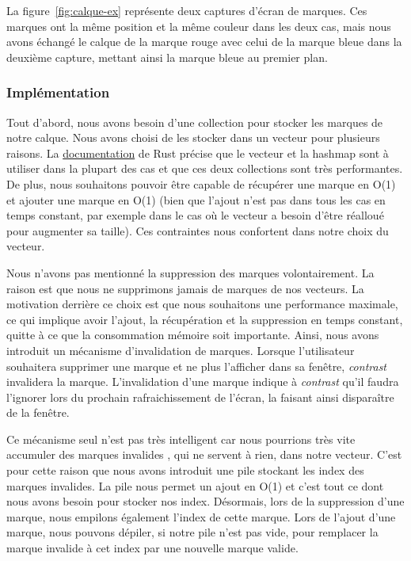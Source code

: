 \documentclass[12pt]{article}
\begin{document}
La figure~\ref{fig:calque-ex} représente deux captures d'écran de marques.
Ces marques ont la même position et la même couleur dans les deux cas, mais nous avons échangé le calque
de la marque rouge avec celui de la marque bleue dans la deuxième capture, mettant ainsi la marque bleue
au premier plan.

\subsubsection{Implémentation}

Tout d'abord, nous avons besoin d'une collection pour stocker les marques de notre calque.
Nous avons choisi de les stocker dans un vecteur pour plusieurs raisons.
La \href{https://doc.rust-lang.org/std/collections/index.html}{documentation} de Rust précise que le
vecteur et la hashmap sont à utiliser dans la plupart des cas et que ces deux collections sont très
performantes.
De plus, nous souhaitons pouvoir être capable de récupérer une marque en O(1) et ajouter une marque en
O(1) (bien que l'ajout n'est pas dans tous les cas en temps constant, par exemple dans le cas où le
vecteur a besoin d'être réalloué pour augmenter sa taille). Ces contraintes nous confortent dans notre
choix du vecteur.

Nous n'avons pas mentionné la suppression des marques volontairement. La raison est que nous ne supprimons
jamais de marques de nos vecteurs. La motivation derrière ce choix est que nous souhaitons une performance
maximale, ce qui implique avoir l'ajout, la récupération et la suppression en temps constant, quitte à
ce que la consommation mémoire soit importante.
Ainsi, nous avons introduit un mécanisme d'invalidation de marques. Lorsque l'utilisateur souhaitera
supprimer une marque et ne plus l'afficher dans sa fenêtre, \textit{contrast} invalidera la marque.
L'invalidation d'une marque indique à \textit{contrast} qu'il faudra l'ignorer lors du prochain
rafraichissement de l'écran, la faisant ainsi disparaître de la fenêtre.

Ce mécanisme seul n'est pas très intelligent car nous pourrions très vite accumuler des marques invalides
, qui ne servent à rien, dans notre vecteur.
C'est pour cette raison que nous avons introduit une pile stockant les index des marques invalides.
La pile nous permet un ajout en O(1) et c'est tout ce dont nous avons besoin pour stocker nos index.
Désormais, lors de la suppression d'une marque, nous empilons également l'index de cette marque.
Lors de l'ajout d'une marque, nous pouvons dépiler, si notre pile n'est pas vide, pour remplacer la
marque invalide à cet index par une nouvelle marque valide.
\end{document}
